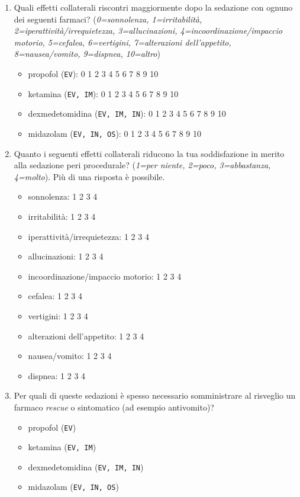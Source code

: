 \begin{enumerate}
           \item Quali effetti collaterali riscontri maggiormente dopo la sedazione con ognuno dei seguenti farmaci? (\emph{0=sonnolenza, 1=irritabilità, 2=iperattività/irrequietezza, 3=allucinazioni, 4=incoordinazione/impaccio motorio, 5=cefalea, 6=vertigini, 7=alterazioni dell’appetito, 8=nausea/vomito, 9=dispnea, 10=altro})
           \begin{itemize}
               \item propofol (\texttt{EV}): 0 1 2 3 4 5 6 7 8 9 10
               \item ketamina (\texttt{EV, IM}): 0 1 2 3 4 5 6 7 8 9 10
               \item dexmedetomidina (\texttt{EV, IM, IN}): 0 1 2 3 4 5 6 7 8 9 10
               \item midazolam (\texttt{EV, IN, OS}): 0 1 2 3 4 5 6 7 8 9 10
           \end{itemize}
           
           \item Quanto i seguenti effetti collaterali riducono la tua soddisfazione in merito alla sedazione peri procedurale? (\emph{1=per niente, 2=poco, 3=abbastanza, 4=molto}). Più di una risposta è possibile. 
           \begin{itemize}
               \item sonnolenza: 1 2 3 4
               \item irritabilità: 1 2 3 4
               \item iperattività/irrequietezza: 1 2 3 4
               \item allucinazioni: 1 2 3 4
               \item incoordinazione/impaccio motorio: 1 2 3 4
               \item cefalea: 1 2 3 4
               \item vertigini: 1 2 3 4
               \item alterazioni dell’appetito: 1 2 3 4
               \item nausea/vomito: 1 2 3 4
               \item dispnea: 1 2 3 4
           \end{itemize}
           
           \item Per quali di queste sedazioni è spesso necessario somministrare al risveglio un farmaco \emph{rescue} o sintomatico (ad esempio antivomito)?
           \begin{itemize}
               \item propofol (\texttt{EV})
               \item ketamina (\texttt{EV, IM})
               \item dexmedetomidina (\texttt{EV, IM, IN})
               \item midazolam (\texttt{EV, IN, OS})
           \end{itemize}
           

\end{enumerate}

